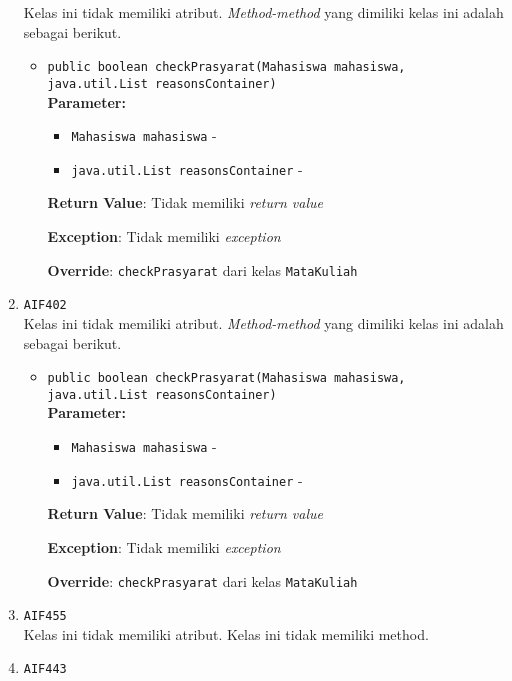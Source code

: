 \documentclass{article}
\begin{document}
\begin{enumerate}
Kelas ini tidak memiliki atribut. \textit{Method-method} yang dimiliki kelas ini adalah sebagai berikut.
\begin{itemize}
\item \texttt{public boolean checkPrasyarat(Mahasiswa mahasiswa, java.util.List reasonsContainer)}\\ 


\textbf{Parameter:}\begin{itemize}
\item \texttt{Mahasiswa mahasiswa} - 
\item \texttt{java.util.List reasonsContainer} - 
\end{itemize}
\textbf{Return Value}: Tidak memiliki \textit{return value}

\textbf{Exception}: Tidak memiliki \textit{exception}

\textbf{Override}: \texttt{checkPrasyarat} dari kelas \texttt{MataKuliah}

\end{itemize}
\item \texttt{AIF402}\\ 


Kelas ini tidak memiliki atribut. \textit{Method-method} yang dimiliki kelas ini adalah sebagai berikut.
\begin{itemize}
\item \texttt{public boolean checkPrasyarat(Mahasiswa mahasiswa, java.util.List reasonsContainer)}\\ 


\textbf{Parameter:}\begin{itemize}
\item \texttt{Mahasiswa mahasiswa} - 
\item \texttt{java.util.List reasonsContainer} - 
\end{itemize}
\textbf{Return Value}: Tidak memiliki \textit{return value}

\textbf{Exception}: Tidak memiliki \textit{exception}

\textbf{Override}: \texttt{checkPrasyarat} dari kelas \texttt{MataKuliah}

\end{itemize}
\item \texttt{AIF455}\\ 


Kelas ini tidak memiliki atribut. Kelas ini tidak memiliki method. \item \texttt{AIF443}\\ 



\end{enumerate}
\end{document}
